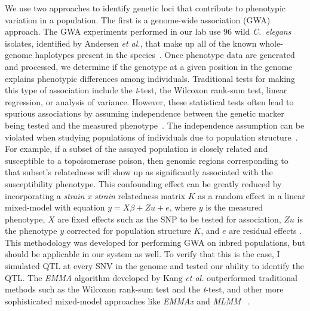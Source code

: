 \documentclass[12pt]{article}
\begin{document}
We use two approaches to identify genetic loci that contribute to phenotypic variation in a population. The first is a genome-wide association (GWA) approach. The GWA experiments performed in our lab use 96 wild {\it C.~elegans} isolates, identified by Andersen {\it et al.}, that make up all of the known whole-genome haplotypes present in the species~\cite{Andersen:2012gm}. Once phenotype data are generated and processed, we determine if the genotype at a given position in the genome explains phenotypic differences among individuals. Traditional tests for making this type of association include the {\it t}-test, the Wilcoxon rank-sum test, linear regression, or analysis of variance. However, these statistical tests often lead to spurious associations by assuming independence between the genetic marker being tested and the measured phenotype~\cite{Kang:2008bx}. The independence assumption can be violated when studying populations of individuals due to population structure~\cite{Price:2010fc}. For example, if a subset of the assayed population is closely related and susceptible to a topoisomerase poison, then genomic regions corresponding to that subset's relatedness will show up as significantly associated with the susceptibility phenotype. This confounding effect can be greatly reduced by incorporating a {\it strain x strain} relatedness matrix $K$ as a random effect in a linear mixed-model with equation $y = X\beta + Zu +e$, where $y$ is the measured phenotype, $X$ are fixed effects such as the SNP to be tested for association, $Zu$ is the phenotype $y$ corrected for population structure $K$, and $e$ are residual effects \cite{Kang:2008bx}. This methodology was developed for performing GWA on inbred populations, but should be applicable in our system as well. To verify that this is the case, I simulated QTL at every SNV in the genome and tested our ability to identify the QTL. The {\it EMMA} algorithm developed by Kang {\it et al.} outperformed traditional methods such as the Wilcoxon rank-sum test and the {\it t}-test, and other more sophisticated mixed-model approaches like {\it EMMAx} and {\it MLMM} ~\cite{Kang:2010fg,Segura:2012hi}.

\vspace{5pt}
\end{document}
